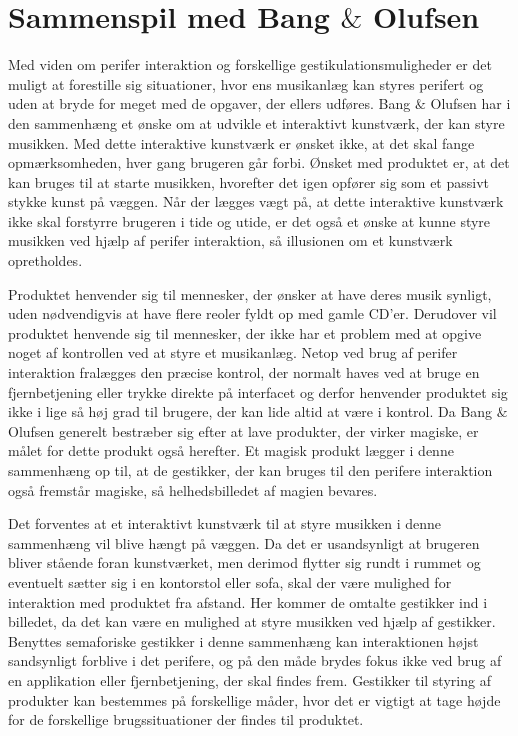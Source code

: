 \section{Sammenspil med Bang $\&$ Olufsen}
\label{SammenspilMedBO}
%
Med viden om perifer interaktion og forskellige gestikulationsmuligheder er det muligt at forestille sig situationer, hvor ens musikanlæg kan styres perifert og uden at bryde for meget med de opgaver, der ellers udføres. Bang $\&$ Olufsen har i den sammenhæng et ønske om at udvikle et interaktivt kunstværk, der kan styre musikken. Med dette interaktive kunstværk er ønsket ikke, at det skal fange opmærksomheden, hver gang brugeren går forbi. Ønsket med produktet er, at det kan bruges til at starte musikken, hvorefter det igen opfører sig som et passivt stykke kunst på væggen. Når der lægges vægt på, at dette interaktive kunstværk ikke skal forstyrre brugeren i tide og utide, er det også et ønske at kunne styre musikken ved hjælp af perifer interaktion, så illusionen om et kunstværk opretholdes. 

Produktet henvender sig til mennesker, der ønsker at have deres musik synligt, uden nødvendigvis at have flere reoler fyldt op med gamle CD'er. Derudover vil produktet henvende sig til mennesker, der ikke har et problem med at opgive noget af kontrollen ved at styre et musikanlæg. Netop ved brug af perifer interaktion fralægges den præcise kontrol, der normalt haves ved at bruge en fjernbetjening eller trykke direkte på interfacet og derfor henvender produktet sig ikke i lige så høj grad til brugere, der kan lide altid at være i kontrol. Da Bang $\&$ Olufsen generelt bestræber sig efter at lave produkter, der virker magiske, er målet for dette produkt også herefter. Et magisk produkt lægger i denne sammenhæng op til, at de gestikker, der kan bruges til den perifere interaktion også fremstår magiske, så helhedsbilledet af magien bevares. 

Det forventes at et interaktivt kunstværk til at styre musikken i denne sammenhæng vil blive hængt på væggen. Da det er usandsynligt at brugeren bliver stående foran kunstværket, men derimod flytter sig rundt i rummet og eventuelt sætter sig i en kontorstol eller sofa, skal der være mulighed for interaktion med produktet fra afstand. Her kommer de omtalte gestikker ind i billedet, da det kan være en mulighed at styre musikken ved hjælp af gestikker. Benyttes semaforiske gestikker i denne sammenhæng kan interaktionen højst sandsynligt forblive i det perifere, og på den måde brydes fokus ikke ved brug af en applikation eller fjernbetjening, der skal findes frem. Gestikker til styring af produkter kan bestemmes på forskellige måder, hvor det er vigtigt at tage højde for de forskellige brugssituationer der findes til produktet.  

